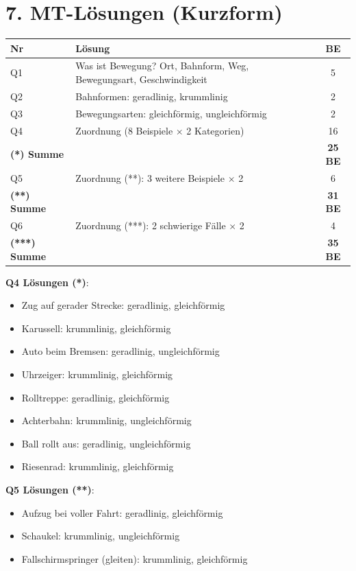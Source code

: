 \documentclass[11pt, a4paper]{article}
\begin{document}
\section*{7. MT-Lösungen (Kurzform)}

\begin{tabular}{|l|p{7cm}|c|}
\hline
\textbf{Nr} & \textbf{Lösung} & \textbf{BE} \\
\hline
Q1 & Was ist Bewegung? Ort, Bahnform, Weg, Bewegungsart, Geschwindigkeit & 5 \\
\hline
Q2 & Bahnformen: geradlinig, krummlinig & 2 \\
\hline
Q3 & Bewegungsarten: gleichförmig, ungleichförmig & 2 \\
\hline
Q4 & Zuordnung (8 Beispiele $\times$ 2 Kategorien) & 16 \\
\hline
\textbf{(*) Summe} & & \textbf{25 BE} \\
\hline
Q5 & Zuordnung (**): 3 weitere Beispiele $\times$ 2 & 6 \\
\hline
\textbf{(**) Summe} & & \textbf{31 BE} \\
\hline
Q6 & Zuordnung (***): 2 schwierige Fälle $\times$ 2 & 4 \\
\hline
\textbf{(***) Summe} & & \textbf{35 BE} \\
\hline
\end{tabular}

\vspace{0.5em}

\textbf{Q4 Lösungen (*)}:
\begin{itemize}[itemsep=1pt]
    \item Zug auf gerader Strecke: geradlinig, gleichförmig
    \item Karussell: krummlinig, gleichförmig
    \item Auto beim Bremsen: geradlinig, ungleichförmig
    \item Uhrzeiger: krummlinig, gleichförmig
    \item Rolltreppe: geradlinig, gleichförmig
    \item Achterbahn: krummlinig, ungleichförmig
    \item Ball rollt aus: geradlinig, ungleichförmig
    \item Riesenrad: krummlinig, gleichförmig
\end{itemize}

\textbf{Q5 Lösungen (**)}:
\begin{itemize}[itemsep=1pt]
    \item Aufzug bei voller Fahrt: geradlinig, gleichförmig
    \item Schaukel: krummlinig, ungleichförmig
    \item Fallschirmspringer (gleiten): krummlinig, gleichförmig
\end{itemize}
\end{document}
